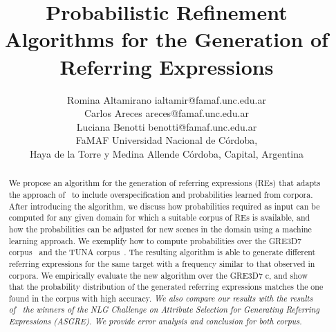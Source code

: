 \documentclass[jair,twoside,11pt,theapa]{article}
\begin{document}
\title{Probabilistic Refinement Algorithms
for the Generation of Referring Expressions}

\author{\name Romina Altamirano \email ialtamir@famaf.unc.edu.ar \\
       \name Carlos Areces \email areces@famaf.unc.edu.ar \\
       \name Luciana Benotti \email benotti@famaf.unc.edu.ar \\ 
       \addr FaMAF Universidad Nacional de C\'ordoba, \\
       Haya de la Torre y Medina Allende
       C\'ordoba, Capital, Argentina
}


\maketitle


\begin{abstract}
We propose an algorithm for the generation of referring expressions (REs) that adapts the approach of~ 
to include overspecification and probabilities learned from corpora.  After introducing the algorithm, we discuss how probabilities required as 
input can be computed for any given domain for which a suitable corpus of REs is available, and how the probabilities can be adjusted for new scenes in the domain using a machine learning approach.  
We exemplify how to compute probabilities over the GRE3D7 corpus~ and the TUNA corpus~.
The resulting algorithm is able to generate different referring expressions for the same target with a frequency similar to that observed in corpora. 
We empirically evaluate the new algorithm over the GRE3D7 c, and show that the probability distribution of the generated referring expressions 
matches the one found in the corpus with high accuracy. \textit{We also compare our results with the results of~ the winners of the NLG Challenge on Attribute Selection for Generating Referring Expressions (ASGRE). We provide error analysis and conclusion for both corpus. }

\end{abstract}
\end{document}
